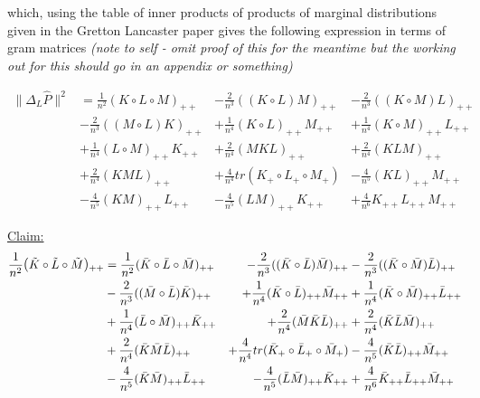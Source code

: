 \documentclass{article}
\newenvironment{claim}[1]{\par\noindent\underline{Claim:}\space#1}{}
\begin{document}
which, using the table of inner products of products of marginal distributions given in the Gretton Lancaster paper gives the following expression in terms of gram matrices \emph{(note to self - omit proof of this for the meantime but the working out for this should go in an appendix or something)}

\begin{align*}
\|\Delta_L \hat{P}\|^2 &= \frac{1}{n^2}(K \circ L\circ M)_{++} &-
\frac{2}{n^3}((K\circ L) M)_{++} & - 
\frac{2}{n^3}((K \circ M) L)_{++} \\&- 
\frac{2}{n^3}((M \circ L) K)_{++} &+ 
\frac{1}{n^4}(K \circ L)_{++} M_{++} &+ 
\frac{1}{n^4}(K \circ M)_{++} L_{++} \\&+ 
\frac{1}{n^4}(L \circ M)_{++} K_{++} &+ 
\frac{2}{n^4}(MKL)_{++} &+ 
\frac{2}{n^4}(KLM)_{++} \\&+ 
\frac{2}{n^4}(KML)_{++} &+ 
\frac{4}{n^4}tr(K_+ \circ L_+ \circ M_+) &-
\frac{4}{n^5}(K L)_{++} M_{++} \\& - 
\frac{4}{n^5}(KM)_{++}L_{++} &- 
\frac{4}{n^5}(LM)_{++} K_{++} &+
\frac{4}{n^6}K_{++} L_{++} M_{++}
\end{align*}

\begin{claim}
\begin{align*}
\frac{1}{n^2}\mathlarger{(}\tilde{K}\circ\tilde{L}\circ\tilde{M}\mathlarger{)}_{++} &= \frac{1}{n^2}(\bar{K} \circ \bar{L}\circ \bar{M})_{++} &-
\frac{2}{n^3}((\bar{K}\circ \bar{L}) \bar{M})_{++} & - 
\frac{2}{n^3}((\bar{K} \circ \bar{M}) \bar{L})_{++} \\&- 
\frac{2}{n^3}((\bar{M} \circ \bar{L}) \bar{K})_{++} &+ 
\frac{1}{n^4}(\bar{K} \circ \bar{L})_{++} \bar{M}_{++} &+ 
\frac{1}{n^4}(\bar{K} \circ \bar{M})_{++} \bar{L}_{++} \\&+ 
\frac{1}{n^4}(\bar{L} \circ \bar{M})_{++} \bar{K}_{++} &+ 
\frac{2}{n^4}(\bar{M}\bar{K}\bar{L})_{++} &+ 
\frac{2}{n^4}(\bar{K}\bar{L}\bar{M})_{++} \\&+ 
\frac{2}{n^4}(\bar{K}\bar{M}\bar{L})_{++} &+ 
\frac{4}{n^4}tr(\bar{K}_+ \circ \bar{L}_+ \circ \bar{M}_+) &-
\frac{4}{n^5}(\bar{K} \bar{L})_{++} \bar{M}_{++} \\& - 
\frac{4}{n^5}(\bar{K}\bar{M})_{++}\bar{L}_{++} &- 
\frac{4}{n^5}(\bar{L}\bar{M})_{++} \bar{K}_{++} &+
\frac{4}{n^6}\bar{K}_{++} \bar{L}_{++} \bar{M}_{++}
\end{align*}
\end{claim}
\end{document}
